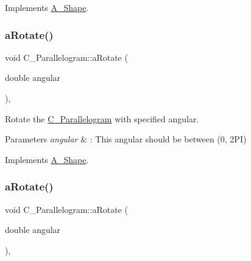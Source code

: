 Implements \hyperlink{classA__Shape_a892688cbbad3297e00e87cce0dbfc76d}{A\+\_\+\+Shape}.

\mbox{\label{classC__Parallelogram_a07b6dfae7100a409cdcf04d710ac9c3f}} 
\subsubsection{\texorpdfstring{a\+Rotate()}{aRotate()}\hspace{0.1cm}{\footnotesize\ttfamily [1/2]}}
{\footnotesize\ttfamily void C\+\_\+\+Parallelogram\+::a\+Rotate (\begin{DoxyParamCaption}\item[{double}]{angular }\end{DoxyParamCaption})\hspace{0.3cm}{\ttfamily [override]}, {\ttfamily [virtual]}}



Rotate the \hyperlink{classC__Parallelogram}{C\+\_\+\+Parallelogram} with specified angular. 


\begin{DoxyParams}{Parameters}
{\em angular} & \+: This angular should be between (0, 2\+PI) \\
\hline
\end{DoxyParams}


Implements \hyperlink{classA__Shape_a25b4e0c34cdb46da5382fe9c7467efaf}{A\+\_\+\+Shape}.

\mbox{\label{classC__Parallelogram_a07b6dfae7100a409cdcf04d710ac9c3f}} 
\subsubsection{\texorpdfstring{a\+Rotate()}{aRotate()}\hspace{0.1cm}{\footnotesize\ttfamily [2/2]}}
{\footnotesize\ttfamily void C\+\_\+\+Parallelogram\+::a\+Rotate (\begin{DoxyParamCaption}\item[{double}]{angular }\end{DoxyParamCaption})\hspace{0.3cm}{\ttfamily [override]}, {\ttfamily [virtual]}}




